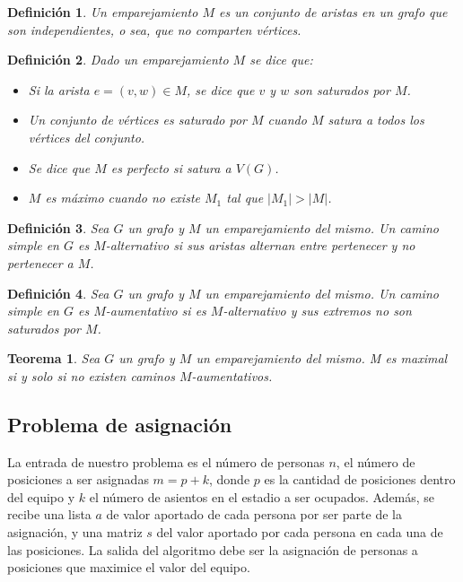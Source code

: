\documentclass[10pt]{article} %
\newtheorem{thm}{Teorema}
\newtheorem{mydef}{Definici\'on}%
\begin{document}
	\begin{mydef}
		Un emparejamiento $ M $ es un conjunto de aristas en un grafo que son independientes, o sea, que no comparten v\'ertices.
	\end{mydef}
	
	\begin{mydef}
		\label{def:matching}
		Dado un emparejamiento $ M $ se dice que:
		\begin{itemize}
			\item Si la arista $ e = (v, w) \in M $, se dice que $ v $ y $ w $ son saturados por $ M $.
			\item Un conjunto de v\'ertices es saturado por $ M $ cuando $ M $ satura a todos los v\'ertices del conjunto.
			\item Se dice que $ M $ es perfecto si satura a $ V(G) $.
			\item $ M $ es m\'aximo cuando no existe $ M_{1} $ tal que $ |M_{1}| > |M| $.
		\end{itemize}
	\end{mydef}
	
	\begin{mydef}
		Sea $ G $ un grafo y $ M $ un emparejamiento del mismo. Un camino simple en $ G $ es $ M $-alternativo si sus aristas alternan entre pertenecer y no pertenecer a $ M $.
	\end{mydef}
	
	\begin{mydef}
		\label{def:aumentativo}
		Sea $ G $ un grafo y $ M $ un emparejamiento del mismo. Un camino simple en $ G $ es $ M $-aumentativo si es $ M $-alternativo y sus extremos no son saturados por $ M $.
	\end{mydef}
	
	\begin{thm}
		Sea $ G $ un grafo y $ M $ un emparejamiento del mismo. M es maximal si y solo si no existen caminos $ M $-aumentativos.
	\end{thm}
	
	\subsection{Problema de asignaci\'on}
	
	La entrada de nuestro problema es el n\'umero de personas $ n $, el n\'umero de posiciones a ser asignadas $ m = p + k $, donde $ p $ es la cantidad de posiciones dentro del equipo y $ k $ el n\'umero de asientos en el estadio a ser ocupados. Adem\'as, se recibe una lista $ a $ de valor aportado de cada persona por ser parte de la asignaci\'on, y una matriz $ s $ del valor aportado por cada persona en cada una de las posiciones. La salida del algoritmo debe ser la asignaci\'on de personas a posiciones que maximice el valor del equipo.
	
\end{document}
